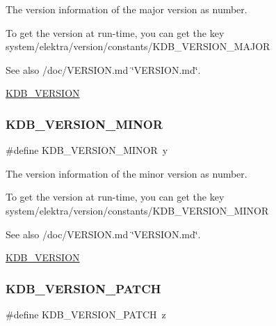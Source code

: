 The version information of the major version as number. 

To get the version at run-\/time, you can get the key system/elektra/version/constants/\+K\+D\+B\+\_\+\+V\+E\+R\+S\+I\+O\+N\+\_\+\+M\+A\+J\+OR

\begin{DoxySeeAlso}{See also}
/doc/\+V\+E\+R\+S\+I\+ON.md \char`\"{}\+V\+E\+R\+S\+I\+O\+N.\+md\char`\"{}. 

\hyperlink{group__kdb_ga2f8953fe5f9f28db54b3ef678ebf40d7}{K\+D\+B\+\_\+\+V\+E\+R\+S\+I\+ON} 
\end{DoxySeeAlso}
\mbox{\label{group__kdb_ga3407dacaacc5d83e2046db872b2408a9}} 
\subsubsection{\texorpdfstring{K\+D\+B\+\_\+\+V\+E\+R\+S\+I\+O\+N\+\_\+\+M\+I\+N\+OR}{KDB\_VERSION\_MINOR}}
{\footnotesize\ttfamily \#define K\+D\+B\+\_\+\+V\+E\+R\+S\+I\+O\+N\+\_\+\+M\+I\+N\+OR~y}



The version information of the minor version as number. 

To get the version at run-\/time, you can get the key system/elektra/version/constants/\+K\+D\+B\+\_\+\+V\+E\+R\+S\+I\+O\+N\+\_\+\+M\+I\+N\+OR

\begin{DoxySeeAlso}{See also}
/doc/\+V\+E\+R\+S\+I\+ON.md \char`\"{}\+V\+E\+R\+S\+I\+O\+N.\+md\char`\"{}. 

\hyperlink{group__kdb_ga2f8953fe5f9f28db54b3ef678ebf40d7}{K\+D\+B\+\_\+\+V\+E\+R\+S\+I\+ON} 
\end{DoxySeeAlso}
\mbox{\label{group__kdb_gaa67fb397397981929b24f52ed2a2d92d}} 
\subsubsection{\texorpdfstring{K\+D\+B\+\_\+\+V\+E\+R\+S\+I\+O\+N\+\_\+\+P\+A\+T\+CH}{KDB\_VERSION\_PATCH}}
{\footnotesize\ttfamily \#define K\+D\+B\+\_\+\+V\+E\+R\+S\+I\+O\+N\+\_\+\+P\+A\+T\+CH~z}



